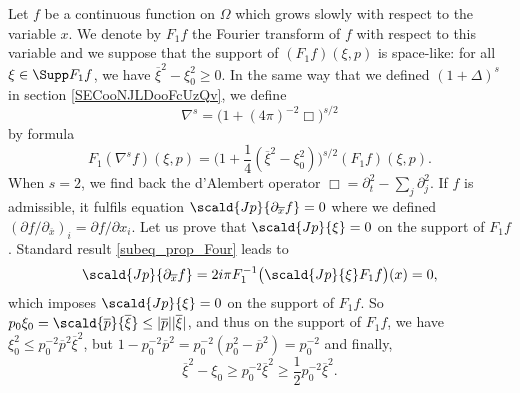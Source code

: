 Let $f$ be a continuous function on $\Omega$ which grows slowly with respect to the variable $x$. We denote by $F_1f$ the Fourier transform of $f$ with respect to this variable and we suppose that the support of $(F_1f)(\xi,p)$ is space-like: for all $\xi\in\Supp F_1f$, we have $\overline{ \xi }^2-\xi_0^2\geq0$. In the same way that we defined $(1+\Delta)^s$ in section \ref{SECooNJLDooFcUzQv}, we define
\[
  \nabla^s=\big( 1+(4\pi)^{-2}\Box \big)^{s/2}
\]
by formula
\begin{equation}
  F_1(\nabla^sf)(\xi,p)=\big( 1+\frac{ 1 }{ 4 }(\overline{ \xi }^2-\xi_0^2) \big)^{s/2}(F_1f)(\xi,p).
\end{equation}
When $s=2$, we find back the d'Alembert operator $\Box=\partial_t^2-\sum_j\partial_j^2$. If $f$ is admissible, it fulfils equation $\scald{ Jp }{ \partial_{\overline{x}}f }=0$ where we defined $(\partial f/\partial_{\overline{x}})_i=\partial f/\partial x_i$. Let us prove that $\scald{ Jp }{ \xi }=0$ on the support of $F_1f$.	Standard result \eqref{subeq_prop_Four} leads to
\[ 
  \scald{ Jp }{ \partial_{\overline{x}}f }=2i\pi F_1^{-1}\big( \scald{ Jp }{ \xi }F_1f \big)(x)=0,
\]
which imposes $\scald{ Jp }{ \xi }=0$ on the support of $F_1f$. So $p_0\xi_0=\scald{ \overline{p} }{ \overline{\xi}}\leq| \overline{p} | |\overline{\xi} |$, and thus on the support of $F_1f$, we have $\xi_0^2\leq p_0^{-2}\overline{p}^2\overline{\xi}^2$, but $1-p_0^{-2}\overline{p}^2=p_0^{-2}(p_0^2-\overline{p}^2)=p_0^{-2}$ and finally,
\[ 
  \overline{\xi}^2-\xi_0\geq p_0^{-2}\overline{\xi}^2\geq\frac{ 1 }{2}p_0^{-2}\overline{\xi}^2.
\]

 
